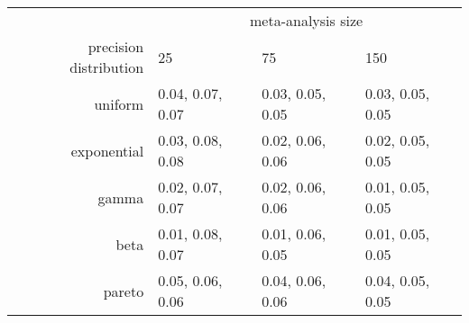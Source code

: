 \begin{tabular}{rlll}
  \hline
  & \multicolumn{3}{c}{meta-analysis size} \\
 precision distribution &25&75&150\\
 \hline
uniform & 0.04, 0.07, 0.07 & 0.03, 0.05, 0.05 & 0.03, 0.05, 0.05 \\ 
  exponential & 0.03, 0.08, 0.08 & 0.02, 0.06, 0.06 & 0.02, 0.05, 0.05 \\ 
  gamma & 0.02, 0.07, 0.07 & 0.02, 0.06, 0.06 & 0.01, 0.05, 0.05 \\ 
  beta & 0.01, 0.08, 0.07 & 0.01, 0.06, 0.05 & 0.01, 0.05, 0.05 \\ 
  pareto & 0.05, 0.06, 0.06 & 0.04, 0.06, 0.06 & 0.04, 0.05, 0.05 \\ 
   \hline
\end{tabular}
